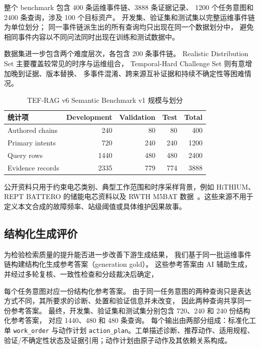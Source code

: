 整个 benchmark 包含 400 条运维事件链、3888 条证据记录、
1200 个任务意图和 2400 条查询，涉及 100 个目标资产。
开发集、验证集和测试集以完整运维事件链为单位划分；
同一事件链派生出的所有查询均只出现在同一个数据划分中，
避免相同事件内容以不同问法同时出现在训练和测试数据中。

数据集进一步包含两个难度层次，各包含 200 条事件链。
Realistic Distribution Set 主要覆盖较常见的时序与运维组合，
Temporal-Hard Challenge Set 则有意增加晚到证据、版本替换、
多事件混淆、跨来源互补证据和持续不确定性等困难情况。

\begin{table}[t]
\caption{TEF-RAG v6 Semantic Benchmark v1 规模与划分}
\label{tab:dataset_stats}
\centering
\small
\begin{tabular}{lrrrr}
\toprule
统计项 & Development & Validation & Test & Total \\
\midrule
Authored chains & 240 & 80 & 80 & 400 \\
Primary intents & 720 & 240 & 240 & 1200 \\
Query rows & 1440 & 480 & 480 & 2400 \\
Evidence records & 2335 & 779 & 774 & 3888 \\
\bottomrule
\end{tabular}
\end{table}

公开资料只用于约束电芯类别、典型工作范围和时序采样背景，例如 HiTHIUM、REPT BATTERO 的储能电芯资料以及 RWTH M5BAT 数据~\cite{hithium2023v11,hithium2024v33,rept2025,rwth2026m5bat}。这些来源不用于定义本文合成的故障频率、站级阈值或具体维护因果故事。

\subsection{结构化生成评价}

为检验检索质量的提升能否进一步改善下游生成结果，
我们基于同一批运维事件链构建结构化生成参考答案（generation gold）。
这些参考答案由 AI 辅助生成，并经过多轮复核、一致性检查和分歧裁决后确定，

每个任务意图对应一份结构化参考答案。
由于同一任务意图的两种查询只是表达方式不同，其所要求的诊断、处置和验证信息并未改变，
因此两种查询共享同一份参考答案。
最终，开发集、验证集和测试集分别包含 720、240 和 240 份结构化参考答案，
对应 1440、480 和 480 条查询。
每个输出由两部分组成：标准化工单 \texttt{work\_order} 与动作计划 \texttt{action\_plan}。工单描述诊断、推荐动作、适用规程、验证/不确定性状态及证据引用；动作计划由原子动作及其依赖关系构成。

